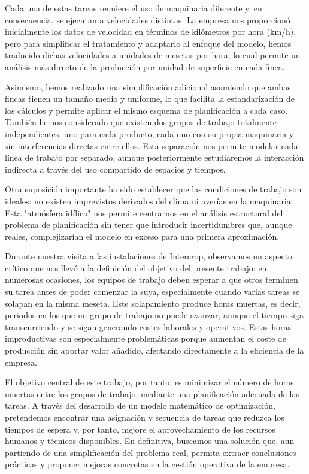 Cada una de estas tareas requiere el uso de maquinaria diferente y, en consecuencia, se ejecutan a velocidades distintas.
La empresa nos proporcionó inicialmente los datos de velocidad en términos de kilómetros por hora (km/h), pero para simplificar el tratamiento y adaptarlo al enfoque del modelo,
hemos traducido dichas velocidades a unidades de mesetas por hora, lo cual permite un análisis más directo de la producción por unidad de superficie en cada finca.

Asimismo, hemos realizado una simplificación adicional asumiendo que ambas fincas tienen un tamaño medio y uniforme, lo que facilita la estandarización de los cálculos y permite aplicar el mismo esquema de planificación a cada caso.
También hemos considerado que existen dos grupos de trabajo totalmente independientes, uno para cada producto, cada uno con su propia maquinaria y sin interferencias directas entre ellos.
Esta separación nos permite modelar cada línea de trabajo por separado, aunque posteriormente estudiaremos la interacción indirecta a través del uso compartido de espacios y tiempos.

Otra suposición importante ha sido establecer que las condiciones de trabajo son ideales: no existen imprevistos derivados del clima ni averías en la maquinaria.
Esta "atmósfera idílica" nos permite centrarnos en el análisis estructural del problema de planificación sin tener que introducir incertidumbres que, aunque reales, complejizarían el modelo en exceso para una primera aproximación.

Durante nuestra visita a las instalaciones de Intercrop, observamos un aspecto crítico que nos llevó a la definición del objetivo del presente trabajo:
en numerosas ocasiones, los equipos de trabajo deben esperar a que otros terminen su tarea antes de poder comenzar la suya, especialmente cuando varias tareas se solapan en la misma meseta.
Este solapamiento produce horas muertas, es decir, periodos en los que un grupo de trabajo no puede avanzar, aunque el tiempo siga transcurriendo y se sigan generando costes laborales y operativos.
Estas horas improductivas son especialmente problemáticas porque aumentan el coste de producción sin aportar valor añadido, afectando directamente a la eficiencia de la empresa.

El objetivo central de este trabajo, por tanto, es minimizar el número de horas muertas entre los grupos de trabajo, mediante una planificación adecuada de las tareas.
A través del desarrollo de un modelo matemático de optimización, pretendemos encontrar una asignación y secuencia de tareas que reduzca los tiempos de espera y, por tanto,
mejore el aprovechamiento de los recursos humanos y técnicos disponibles. En definitiva, buscamos una solución que, aun partiendo de una simplificación del problema real, permita extraer conclusiones prácticas y proponer mejoras concretas en la gestión operativa de la empresa.



